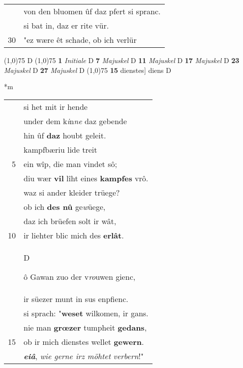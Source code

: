 \documentclass[8pt,a4paper,notitlepage]{article}
\begin{document}
\begin{table}[ht]
\begin{minipage}[t]{0.5\linewidth}
\begin{tabular}{rl}
 & von den bluomen ûf daz pfert si spranc.\\ 
 & si bat in, daz er rite vür.\\ 
30 & "ez wære êt schade, ob ich verlür\\ 
\end{tabular}
\scriptsize
\line(1,0){75} \newline
D \newline
\line(1,0){75} \newline
\textbf{1} \textit{Initiale} D  \textbf{7} \textit{Majuskel} D  \textbf{11} \textit{Majuskel} D  \textbf{17} \textit{Majuskel} D  \textbf{23} \textit{Majuskel} D  \textbf{27} \textit{Majuskel} D  \newline
\line(1,0){75} \newline
\textbf{15} dienstes] diens D \newline
\end{minipage}
\hspace{0.5cm}
\begin{minipage}[t]{0.5\linewidth}
\small
\begin{center}*m
\end{center}
\begin{tabular}{rl}
 & si het mit ir hende\\ 
 & under dem k\textit{i}n\textit{ne} daz gebende\\ 
 & hin ûf \textbf{daz} houbt geleit.\\ 
 & kampfbæriu lide treit\\ 
5 & ein wîp, die man vindet sô;\\ 
 & diu wær \textbf{vil} lîht eines \textbf{kampfes} vrô.\\ 
 & waz si ander kleider trüege?\\ 
 & ob ich \textbf{des nû} ge\textit{w}üege,\\ 
 & daz ich brüefen solt ir wât,\\ 
10 & ir liehter blic mich des \textbf{erlât}.\\ 
 & \begin{large}D\end{large}ô Gawan zuo der v\textit{ro}uwen gienc,\\ 
 & ir süezer munt in sus enpfienc.\\ 
 & si sprach: "\textbf{weset} wilkomen, ir gans.\\ 
 & nie man \textbf{grœzer} tumpheit \textbf{gedans},\\ 
15 & ob ir mich dienstes wellet \textbf{gewern}.\\ 
 & \textit{\textbf{eiâ}}, \textit{wie gerne irz möhtet} \textit{verbern}!"\\ 

\end{tabular}
\end{minipage}
\end{table}
\end{document}
